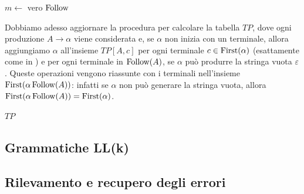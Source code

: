 \begin{algorithm}[tb!]
\caption{Costruzione di $\Follow$}
\label{alg:costruzione-follow}
$m\gets$ vero\;
\Return $\Follow$
\end{algorithm}

Dobbiamo adesso aggiornare la procedura per calcolare la tabella $TP$, dove ogni produzione $A\to \alpha$ viene
considerata e, se $\alpha$ non inizia con un terminale, allora aggiungiamo $\alpha$ all'insieme $TP[A,c]$ per ogni
terminale $c\in \operatorname{First}(\alpha)$ (esattamente come in ) e per ogni
terminale in $\operatorname{Follow}(A)$, se $\alpha$ può produrre la stringa vuota $\varepsilon$.
Queste operazioni vengono riassunte con i terminali nell'insieme $\operatorname{First}(\alpha\operatorname{Follow}(A))$: infatti se $\alpha$ non può
generare la stringa vuota, allora $\operatorname{First}(\alpha\operatorname{Follow}(A)) = \operatorname{First}(\alpha)$.



\begin{algorithm}[tb!]
\caption{Costruzione della tabella di parsing $TP$}
\label{alg:costruzione-tabella-parsing-da-first-follow}
\Return $TP$
\end{algorithm}


\subsection{Grammatiche LL(k)}\label{sec:llk}

\subsection{Rilevamento e recupero degli errori}\label{sec:errori-ll}


